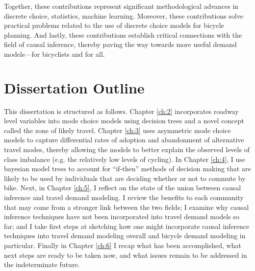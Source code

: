 Together, these contributions represent significant methodological advances in discrete choice, statistics, machine learning. Moreover, these contributions solve practical problems related to the use of discrete choice models for bicycle planning. And lastly, these contributions establish critical connections with the field of causal inference, thereby paving the way towards more useful demand models---for bicyclists and for all.

\section{Dissertation Outline}
\label{sec:dissertation-outline}
This dissertation is structured as follows. Chapter \ref{ch:2} incorporates roadway level variables into mode choice models using decision trees and a novel concept called the zone of likely travel. Chapter \ref{ch:3} uses asymmetric mode choice models to capture differential rates of adoption and abandonment of alternative travel modes, thereby allowing the models to better explain the observed levels of class imbalance (e.g. the relatively low levels of cycling). In Chapter \ref{ch:4}, I use bayesian model trees to account for ``if-then'' methods of decision making that are likely to be used by individuals that are deciding whether or not to commute by bike. Next, in Chapter \ref{ch:5}, I reflect on the state of the union between causal inference and travel demand modeling. I review the benefits to each community that may come from a stronger link between the two fields; I examine why causal inference techniques have not been incorporated into travel demand models so far; and I take first steps at sketching how one might incorporate causal inference techniques into travel demand modeling overall and bicycle demand modeling in particular. Finally in Chapter \ref{ch:6} I recap what has been accomplished, what next steps are ready to be taken now, and what issues remain to be addressed in the indeterminate future.

\newpage
\renewcommand\bibname{{References}} %



